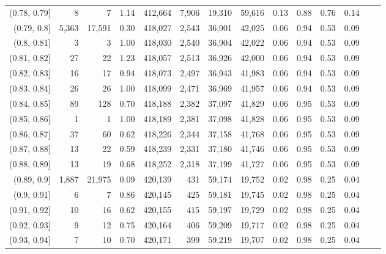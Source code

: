 \begin{tabular}{rrrrrrrrrrrrrr}
(0.78, 0.79]   &       8 &       7 &      1.14 &  412,664 &    7,906 &  19,310 &  59,616 &  0.13 &  0.88 &  0.76 &      0.14 \\
(0.79, 0.8]    &   5,363 &  17,591 &      0.30 &  418,027 &    2,543 &  36,901 &  42,025 &  0.06 &  0.94 &  0.53 &      0.09 \\
(0.8, 0.81]    &       3 &       3 &      1.00 &  418,030 &    2,540 &  36,904 &  42,022 &  0.06 &  0.94 &  0.53 &      0.09 \\
(0.81, 0.82]   &      27 &      22 &      1.23 &  418,057 &    2,513 &  36,926 &  42,000 &  0.06 &  0.94 &  0.53 &      0.09 \\
(0.82, 0.83]   &      16 &      17 &      0.94 &  418,073 &    2,497 &  36,943 &  41,983 &  0.06 &  0.94 &  0.53 &      0.09 \\
(0.83, 0.84]   &      26 &      26 &      1.00 &  418,099 &    2,471 &  36,969 &  41,957 &  0.06 &  0.94 &  0.53 &      0.09 \\
(0.84, 0.85]   &      89 &     128 &      0.70 &  418,188 &    2,382 &  37,097 &  41,829 &  0.06 &  0.95 &  0.53 &      0.09 \\
(0.85, 0.86]   &       1 &       1 &      1.00 &  418,189 &    2,381 &  37,098 &  41,828 &  0.06 &  0.95 &  0.53 &      0.09 \\
(0.86, 0.87]   &      37 &      60 &      0.62 &  418,226 &    2,344 &  37,158 &  41,768 &  0.06 &  0.95 &  0.53 &      0.09 \\
(0.87, 0.88]   &      13 &      22 &      0.59 &  418,239 &    2,331 &  37,180 &  41,746 &  0.06 &  0.95 &  0.53 &      0.09 \\
(0.88, 0.89]   &      13 &      19 &      0.68 &  418,252 &    2,318 &  37,199 &  41,727 &  0.06 &  0.95 &  0.53 &      0.09 \\
(0.89, 0.9]    &   1,887 &  21,975 &      0.09 &  420,139 &      431 &  59,174 &  19,752 &  0.02 &  0.98 &  0.25 &      0.04 \\
(0.9, 0.91]    &       6 &       7 &      0.86 &  420,145 &      425 &  59,181 &  19,745 &  0.02 &  0.98 &  0.25 &      0.04 \\
(0.91, 0.92]   &      10 &      16 &      0.62 &  420,155 &      415 &  59,197 &  19,729 &  0.02 &  0.98 &  0.25 &      0.04 \\
(0.92, 0.93]   &       9 &      12 &      0.75 &  420,164 &      406 &  59,209 &  19,717 &  0.02 &  0.98 &  0.25 &      0.04 \\
(0.93, 0.94]   &       7 &      10 &      0.70 &  420,171 &      399 &  59,219 &  19,707 &  0.02 &  0.98 &  0.25 &      0.04 \\

\end{tabular}
